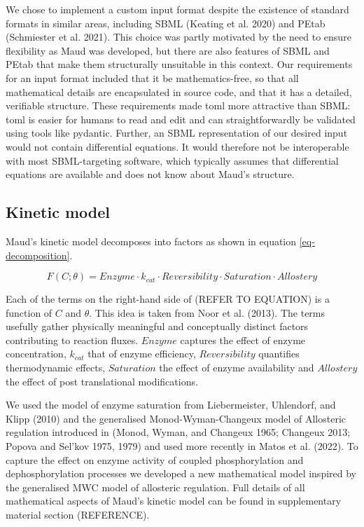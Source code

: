 \documentclass[
  letterpaper,
  DIV=11,
  numbers=noendperiod]{scrartcl}
\begin{document}
We chose to implement a custom input format despite the existence of
standard formats in similar areas, including SBML (Keating et al. 2020)
and PEtab (Schmiester et al. 2021). This choice was partly motivated by
the need to ensure flexibility as Maud was developed, but there are also
features of SBML and PEtab that make them structurally unsuitable in
this context. Our requirements for an input format included that it be
mathematics-free, so that all mathematical details are encapsulated in
source code, and that it has a detailed, verifiable structure. These
requirements made toml more attractive than SBML: toml is easier for
humans to read and edit and can straightforwardly be validated using
tools like pydantic. Further, an SBML representation of our desired
input would not contain differential equations. It would therefore not
be interoperable with most SBML-targeting software, which typically
assumes that differential equations are available and does not know
about Maud's structure.

\hypertarget{kinetic-model}{%
\subsection{Kinetic model}\label{kinetic-model}}

Maud's kinetic model decomposes into factors as shown in equation
\eqref{eq-decomposition}.

\begin{equation}
F(C;\theta) = Enzyme\cdot k_{cat}\cdot Reversibility \cdot Saturation \cdot Allostery \label{eq-decomposition}
\end{equation}

Each of the terms on the right-hand side of (REFER TO EQUATION) is a
function of \(C\) and \(\theta\). This idea is taken from Noor et al.
(2013). The terms usefully gather physically meaningful and conceptually
distinct factors contributing to reaction fluxes. \(Enzyme\) captures
the effect of enzyme concentration, \(k_{cat}\) that of enzyme
efficiency, \(Reversibility\) quantifies thermodynamic effects,
\(Saturation\) the effect of enzyme availability and \(Allostery\) the
effect of post translational modifications.

We used the model of enzyme saturation from Liebermeister, Uhlendorf,
and Klipp (2010) and the generalised Monod-Wyman-Changeux model of
Allosteric regulation introduced in (Monod, Wyman, and Changeux 1965;
Changeux 2013; Popova and Sel'kov 1975, 1979) and used more recently in
Matos et al. (2022). To capture the effect on enzyme activity of coupled
phosphorylation and dephosphorylation processes we developed a new
mathematical model inspired by the generalised MWC model of allosteric
regulation. Full details of all mathematical aspects of Maud's kinetic
model can be found in supplementary material section (REFERENCE).
\end{document}
